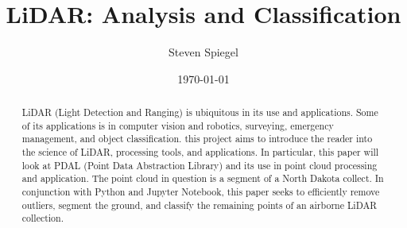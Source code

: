 \documentclass[11pt]{article}
\theoremstyle{definition}
\begin{document}
	\lstset{language=python} 
	\title{LiDAR: Analysis and Classification}
	
	\author{Steven Spiegel}
	\date{\today}
	\maketitle

	\begin{abstract}
		LiDAR (Light Detection and Ranging) is ubiquitous in its use and applications.  Some of its applications is in computer vision and robotics, surveying, emergency management, and object classification.  this project aims to introduce the reader into the science of LiDAR, processing tools, and applications.  In particular, this paper will look at PDAL (Point Data Abstraction Library) and its use in point cloud processing and application.  The point cloud in question is a segment of a North Dakota collect.  In conjunction with Python and Jupyter Notebook, this paper seeks to efficiently remove outliers, segment the ground, and classify the remaining points of an airborne LiDAR collection. 
	\end{abstract}
	\newpage
\end{document}
